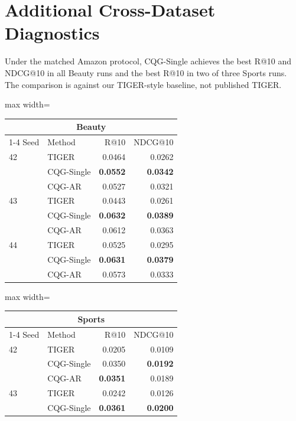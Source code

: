\documentclass[preprint,12pt]{elsarticle}
\begin{document}
\section{Additional Cross-Dataset Diagnostics}
\label{app:auto-completed}
Under the matched Amazon protocol, CQG-Single achieves the best R@10 and
NDCG@10 in all Beauty runs and the best R@10 in two of three Sports runs.
The comparison is against our TIGER-style baseline, not published TIGER.
\begin{table}[htbp]
\centering
\small
\begin{minipage}[t]{0.48\textwidth}
\centering
\begin{adjustbox}{max width=\linewidth}
\begin{tabular}{llrr}
\toprule
\multicolumn{4}{c}{\textbf{Beauty}} \\
\cmidrule(lr){1-4}
Seed & Method & R@10 & NDCG@10 \\
\midrule
42 & TIGER & 0.0464 & 0.0262 \\
 & CQG-Single & \textbf{0.0552} & \textbf{0.0342} \\
 & CQG-AR & 0.0527 & 0.0321 \\
43 & TIGER & 0.0443 & 0.0261 \\
 & CQG-Single & \textbf{0.0632} & \textbf{0.0389} \\
 & CQG-AR & 0.0612 & 0.0363 \\
44 & TIGER & 0.0525 & 0.0295 \\
 & CQG-Single & \textbf{0.0631} & \textbf{0.0379} \\
 & CQG-AR & 0.0573 & 0.0333 \\
\bottomrule
\end{tabular}
\end{adjustbox}
\end{minipage}\hfill
\begin{minipage}[t]{0.48\textwidth}
\centering
\begin{adjustbox}{max width=\linewidth}
\begin{tabular}{llrr}
\toprule
\multicolumn{4}{c}{\textbf{Sports}} \\
\cmidrule(lr){1-4}
Seed & Method & R@10 & NDCG@10 \\
\midrule
42 & TIGER & 0.0205 & 0.0109 \\
 & CQG-Single & 0.0350 & \textbf{0.0192} \\
 & CQG-AR & \textbf{0.0351} & 0.0189 \\
43 & TIGER & 0.0242 & 0.0126 \\
 & CQG-Single & \textbf{0.0361} & \textbf{0.0200} \\

\end{tabular}
\end{adjustbox}
\end{minipage}
\end{table}
\end{document}
